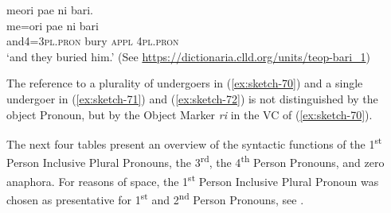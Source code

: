 \documentclass[output=paper]{langscibook}
\begin{document}
\ea\label{ex:sketch-72}
    meori pae ni bari.\\
    \gll me=ori pae ni bari\\
    and4=3\textsc{pl}.\textsc{pron} bury \textsc{appl} 4\textsc{pl}.\textsc{pron}\\
    \glt `and they buried him.' (See \url{https://dictionaria.clld.org/units/teop-bari\_1})
\z

The reference to a plurality of undergoers in (\ref{ex:sketch-70}) and a single undergoer in (\ref{ex:sketch-71}) and (\ref{ex:sketch-72}) is not distinguished by the object Pronoun, but by the Object Marker \textit{ri} in the VC of (\ref{ex:sketch-70}).

The next four tables present an overview of the syntactic functions of the 1\textsuperscript{st} Person Inclusive Plural Pronouns, the 3\textsuperscript{rd}, the 4\textsuperscript{th} Person Pronouns, and zero anaphora. For reasons of space, the 1\textsuperscript{st} Person Inclusive Plural Pronoun was chosen as presentative for 1\textsuperscript{st} and 2\textsuperscript{nd} Person Pronouns, see .
\end{document}
